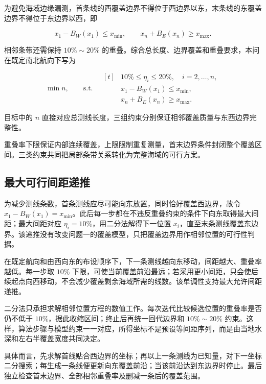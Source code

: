 为避免海域边缘漏测，首条线的西覆盖边界不得位于西边界以东，末条线的东覆盖边界不得位于东边界以西，即

\begin{equation}
  x_1-B_W(x_1)\le x_{\min},\qquad
  x_n+B_E(x_n)\ge x_{\max}.
\end{equation}

相邻条带还需保持 $10\%\sim20\%$ 的重叠。综合总长度、边界覆盖和重叠要求，本问在既定南北航向下写为

\begin{equation}
  \min n,\qquad \text{s.t.}\quad
  \begin{aligned}[t]
    &10\%\le\eta_i\le20\%,\quad i=2,\dots,n,\\
    &x_1-B_W(x_1)\le x_{\min},\\
    &x_n+B_E(x_n)\ge x_{\max}.
  \end{aligned}
  \label{eq:q3_opt}
\end{equation}

目标中的 $n$ 直接对应总测线长度，三组约束分别保证相邻覆盖质量与东西边界完整性。

重叠率下限保证内部连续覆盖，上限限制重复测量，首末边界条件封闭整个覆盖区间。三类约束共同把局部条带关系转化为完整海域的可行方案。

\subsection{最大可行间距递推}

为减少测线条数，首条测线应尽可能向东放置，同时恰好覆盖西边界，故令 $x_1-B_W(x_1)=x_{\min}$。此后每一步都在不违反重叠约束的条件下向东取得最大间距；最大间距对应 $\eta_i=10\%$，用二分法解得下一位置 $x_i$，直至末条测线覆盖东边界。该递推没有改变问题一的覆盖模型，只把覆盖边界用作相邻位置的可行性判据。

在既定航向和由西向东的布设顺序下，下一条测线越向东移动，间距越大、重叠率越低。每一步取 $10\%$ 下限，可使当前覆盖前沿最远；若采用更小间距，只会使后续起点向西移动，不会减少覆盖剩余海域所需的线数。该单调性支持最大允许间距递推。

二分法只承担求解相邻位置方程的数值工作。每次迭代比较候选位置的重叠率是否仍不低于 $10\%$，据此收缩区间；终止后再统一回代边界和 $10\%\sim20\%$ 约束。这样，算法步骤与模型约束一一对应，所得坐标不是预设等间距序列，而是由当地水深和左右半覆盖宽度共同决定。

具体而言，先求解首线贴合西边界的坐标；再以上一条测线为已知量，对下一坐标二分搜索；每生成一条线便更新向东覆盖前沿；当该前沿达到东边界时停止。最后独立检查首末边界、全部相邻重叠率及删减一条后的覆盖范围。

